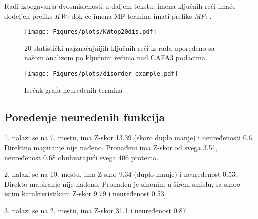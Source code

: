 Radi izbegavanja dvosmislenosti u daljem tekstu, imena ključnih reči imaće
dodeljen prefiks \textit{KW: } dok će imena MF termina imati prefiks
\textit{MF: }.

\clearpage

\begin{figure}[th]
\hspace*{-2.5cm} 
\texttt{[image: Figures/plots/KWtop20dis.pdf]}
\decoRule
\caption {
  20 statistički najznačajnijih  ključnih reči iz rada
  \parencite{Xie2007} upoređeno sa našom analizom po ključnim rečima nad CAFA3 podacima.
}
\label{fig:KWtop20dis}
\end{figure}

\begin{figure}[th]
\hspace*{-2.5cm} 
\texttt{[image: Figures/plots/disorder\_example.pdf]}
\decoRule
\caption {
  Isečak grafa neuređenih termina
}
\label{fig:disorder_example}
\end{figure}



\subsection{Poređenje neuređenih funkcija}



1.  nalazi se na 7. mestu, ima  Z-skor 13.39 (skoro duplo manje) i neuređenosti 0.6.
Direktno mapiranje nije nađeno. Pronađeni 
ima Z-skor od svega 3.51, neuređenost 0.68 obuhvatajući svega 406 proteina.

2.  nalazi se na 10. mestu, ima Z-skor 9.34 (duplo manje) i neuređenost 0.53.
Direkto mapiranje nije nađeno. Pronađen je sinonim u širem smislu,
 sa skoro istim karakteristikam Z-skor 9.79 i neuređenost 0.53.

3.  nalazi se na 2. mestu, ima Z-skor 31.1 i neuređenost 0.87.

